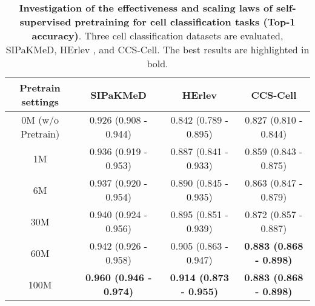 \clearpage
\begin{table}[h] 
\renewcommand{\arraystretch}{1.5}
\renewcommand{\tablename}{Extended Data Table.}
\centering 
\caption{\textbf{Investigation of the effectiveness and scaling laws of self-supervised pretraining for cell classification tasks (Top-1 accuracy)}. Three cell classification datasets are evaluated, SIPaKMeD\cite{plissiti2018sipakmed}, HErlev \cite{jantzen2005pap}, and CCS-Cell. The best results are highlighted in bold.}
\begin{tabular}{c|ccc} 
\hline
\rowcolor{cusyellow} \textbf{Pretrain settings }& \textbf{SIPaKMeD} &\textbf{HErlev} & \textbf{CCS-Cell} \\ 
\hline
0M (w/o Pretrain)&0.926 (0.908 - 0.944) & 0.842 (0.789 - 0.895)&0.827 (0.810 - 0.844)\\
\rowcolor{cusyellowl} 1M& 0.936 (0.919 - 0.953) & 0.887 (0.841 - 0.933) & 0.859 (0.843 - 0.875) \\
6M&0.937 (0.920 - 0.954) & 0.890 (0.845 - 0.935)&0.863 (0.847 - 0.879)\\
\rowcolor{cusyellowl} 30M&0.940 (0.924 - 0.956) & 0.895 (0.851 - 0.939)&0.872 (0.857 - 0.887)\\
60M&0.942 (0.926 - 0.958) & 0.905 (0.863 - 0.947)&\textbf{0.883 (0.868 - 0.898)}\\
\rowcolor{cusyellowl} 100M&\textbf{0.960 (0.946 - 0.974)} & \textbf{0.914 (0.873 - 0.955)}&\textbf{0.883 (0.868 - 0.898)}\\
\hline
\end{tabular} 
\label{ST_pretrain_cell}
\end{table}

